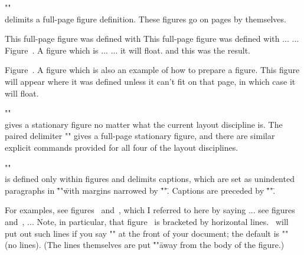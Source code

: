 \*\+"\beginpagefigure"\+\\delimits a full-page figure definition.
These figures go on pages by themselves.

\beginpagefigure

\vfil

\noindent This full-page figure was defined with
\beginverb
\beginpagefigure
\vfil
\noindent This full-page figure was defined with ...
  ...
\begincaption
Figure~.  A figure which is ...
... it will float.
\vfil
\endcaption
\endpagefigure
\endverb
and this was the result.

\vfil

\begincaption
Figure~.  A figure which is also an example of how to
prepare a figure.  This figure will appear where it was defined
unless it can't fit on that page, in which case it will float.
\endcaption

\endpagefigure

\*\+"\beginstationaryfigure"\+\\gives a stationary figure no
matter what the current layout discipline is.  The paired
delimiter "\beginstationarypagefigure" gives a full-page
stationary figure, and there are similar explicit commands
provided for all four of the layout disciplines.

\*\+"\begincaption"\+\\is defined only within figures and
delimits captions, which are set as unindented paragraphs in
\="\captionfont"\= with margins narrowed by \="\captionindent"\=.
Captions are preceded by \="\abovecaptionskip"\=.

\endgab

For examples, see figures~ and~, which I
referred to here by saying
\beginverb
... see figures~ and~, ...
\endverb
Note, in particular, that figure~ is bracketed by
horizontal lines.  \ytex\ will put out such lines if you say
\:"\figurelinetrue"\: at the front of your document; the default
is \:"\figurelinefalse"\: (no lines).  (The lines themselves are
put \="\figurelinedrop"\= away from the body of the figure.)

